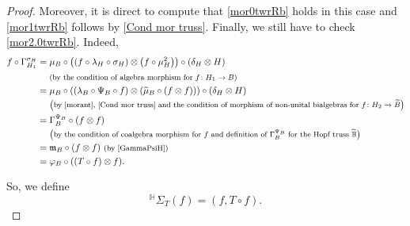 \documentclass[pdftex]{sigma}
\numberwithin{equation}{section}
\begin{document}
\begin{proof}
Moreover, it is direct to compute that \eqref{mor0twrRb} holds in this case and \eqref{mor1twrRb} follows by \eqref{Cond mor truss}. Finally, we still have to check \eqref{mor2.0twrRb}. Indeed,
\begin{align*}
f\circ \Gamma_{H_{1}}^{\sigma_{H}}
={}&\mu_{B}\circ\bigl((f\circ\lambda_{H}\circ \sigma_{H})\otimes\bigl(f\circ\mu_{H}^{2}\bigr)\bigr)\circ(\delta_{H}\otimes H)\\
&{} \text{\footnotesize\textnormal{(by the condition of algebra morphism for $f\colon H_{1}\rightarrow B$)}}\\
={}&\mu_{B}\circ((\lambda_{B}\circ\Psi_{B}\circ f)\otimes (\widetilde{\mu}_{B}\circ(f\otimes f)))\circ(\delta_{H}\otimes H)\\
&{} \text{\footnotesize\textnormal{\big(by \eqref{morant}, \eqref{Cond mor truss} and the condition of morphism of non-unital bialgebras for $f\colon H_{2}\rightarrow \widetilde{B}$\big)}}\\
={}&\Gamma_{B}^{\Psi_{B}}\circ(f\otimes f)\\
&{} \text{\footnotesize\textnormal{\big(by the condition of coalgebra morphism for $f$ and definition of $\Gamma_{B}^{\Psi_{B}}$ for the Hopf truss $\widetilde{\mathbb{B}}$\big)}}\\
={}&\mathfrak{m}_{B}\circ(f\otimes f)\ \text{\footnotesize\textnormal{(by \eqref{GammaPsiH})}}\\
={}&\varphi_{B}\circ((T\circ f)\otimes f).
\end{align*}

So, we define
\[{}^{\mathbb{H}}\Sigma_{T}(f)=(f,T\circ f).\]


\end{proof}
\end{document}

